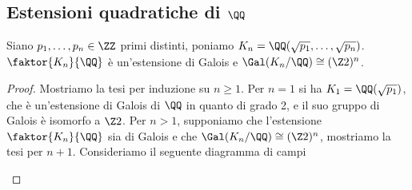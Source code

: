 \documentclass[11pt]{scrartcl}
\begin{document}
\newpage

\subsection{Estensioni quadratiche di $\QQ$}

\begin{theorem}
    Siano $p_1, \ldots, p_n \in \ZZ$ primi distinti, poniamo $K_n = 
    \QQ(\sqrt{p_1}, \ldots, \sqrt{p_n})$. $\faktor{K_n}{\QQ}$ è un'estensione
    di Galois e $\Gal(K_n/\QQ) \cong (\Z2)^n$.
\end{theorem}

\begin{proof}
    Mostriamo la tesi per induzione su $n \geq 1$. Per $n = 1$ si ha $K_1 = \QQ(\sqrt{p_1})$,
    che è un'estensione di Galois di $\QQ$ in quanto di grado 2, e il suo 
    gruppo di Galois è isomorfo a $\Z2$. Per $n > 1$, supponiamo che l'estensione
    $\faktor{K_n}{\QQ}$ sia di Galois e che $\Gal(K_n/\QQ) \cong (\Z2)^n$, 
    mostriamo la tesi per $n + 1$. Consideriamo il seguente diagramma di campi
    \begin{center}
\end{center}
\end{proof}
\end{document}
